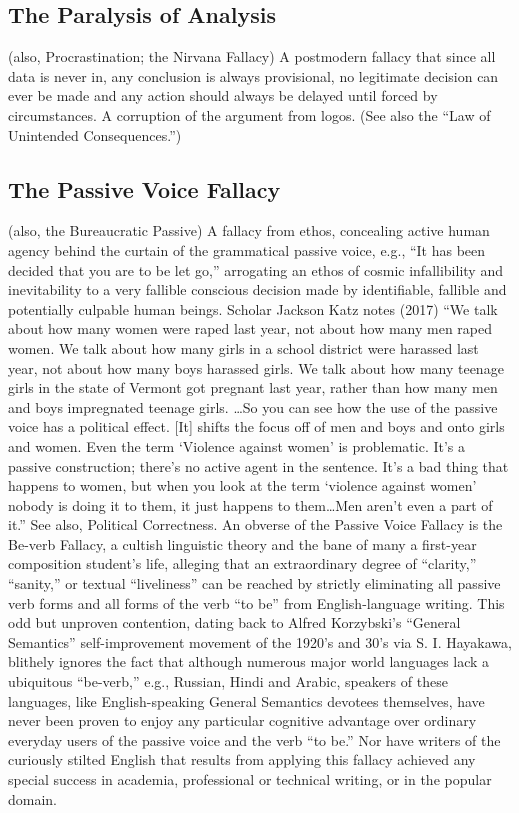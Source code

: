\documentclass[10pt,a4paper,british]{article}
\begin{document}
\begin{multicols}{2}
    \subsection{The Paralysis of Analysis} (also, Procrastination; the Nirvana Fallacy) A postmodern fallacy that since all data is never in, any conclusion is always provisional, no legitimate decision can ever be made and any action should always be delayed until forced by circumstances. A corruption of the argument from logos. (See also the ``Law of Unintended Consequences.'') 

	\subsection{The Passive Voice Fallacy} (also, the Bureaucratic Passive) A fallacy from ethos, concealing active human agency behind the curtain of the grammatical passive voice, e.g., ``It has been decided that you are to be let go,'' arrogating an ethos of cosmic infallibility and inevitability to a very fallible conscious decision made by identifiable, fallible and potentially culpable human beings. Scholar Jackson Katz notes (2017) ``We talk about how many women were raped last year, not about how many men raped women. We talk about how many girls in a school district were harassed last year, not about how many boys harassed girls. We talk about how many teenage girls in the state of Vermont got pregnant last year, rather than how many men and boys impregnated teenage girls. \ldots  So you can see how the use of the passive voice has a political effect. [It] shifts the focus off of men and boys and onto girls and women. Even the term `Violence against women' is problematic. It's a passive construction; there's no active agent in the sentence. It's a bad thing that happens to women, but when you look at the term `violence against women' nobody is doing it to them, it just happens to them\ldots Men aren't even a part of it.''  See also, Political Correctness. An obverse of the Passive Voice Fallacy is the Be{-}verb Fallacy, a cultish linguistic theory and the bane of many a first{-}year composition student's life, alleging that an extraordinary degree of ``clarity,'' ``sanity,'' or textual ``liveliness'' can be reached by strictly eliminating all passive verb forms and all forms of the verb ``to be'' from English{-}language writing. This odd but unproven contention, dating back to Alfred Korzybski's ``General Semantics'' self{-}improvement movement of the 1920's and 30's via S. I.  Hayakawa, blithely ignores the fact that although numerous major world languages lack a ubiquitous ``be{-}verb,'' e.g., Russian, Hindi and Arabic, speakers of these languages, like English{-}speaking General Semantics devotees themselves, have never been proven to enjoy any particular cognitive advantage over ordinary everyday users of the passive voice and the verb ``to be.'' Nor have writers of the curiously stilted English that results from applying this fallacy achieved any special success in academia, professional or technical writing, or in the popular domain.  


\end{multicols}
\end{document}
